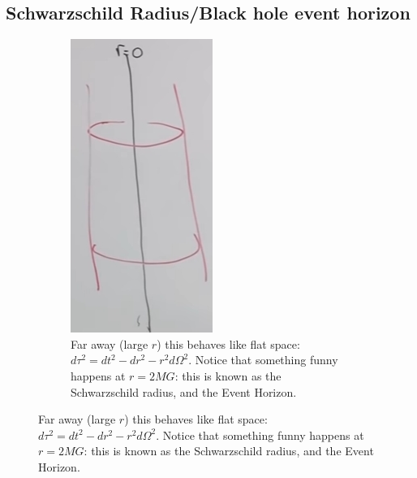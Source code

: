 \documentclass[]{article}
\begin{document}
{\subsection{Schwarzschild Radius/Black hole event horizon}

\begin{figure}[H]
	\begin{center}
		\caption[Illustrating the Schwarzschild Metric]{Illustrating the Schwarzschild Metric. The vertical axis represents time.}
		\begin{subfigure}[t]{0.45\textwidth}
			\caption{Far away (large $r$) this behaves like flat space: $ d \tau^2 =dt^2-dr^2 - r^2 d\Omega^2$. Notice that something funny happens at $r=2MG$: this is known as the Schwarzschild radius, and the Event Horizon.}\label{fig:gr-6-schwartzchild-radius}
			\includegraphics[width=\textwidth]{gr-6-schwartzchild-radius}

\end{subfigure}
\end{center}
\end{figure}}
\end{document}
